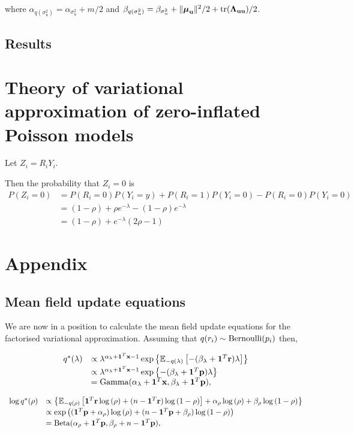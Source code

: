 \documentclass{article}[12pt]
\begin{document}
where $\alpha_{q(\sigma^2_u)} = \alpha_{\sigma^2_u} + m/2$ and
$\beta_{q(\sigma^2_u)} = \beta_{\sigma^2_u} + \|{\boldsymbol \mu}_{\bf u}\|^2/2 +  \text{tr}{({\boldsymbol\Lambda}_{{\bf u}{\bf u}})}/2$.

\subsection{Results}

\section{Theory of variational approximation of zero-inflated Poisson models}
Let $Z_i = R_i Y_i$.

Then the probability that $Z_i = 0$ is
$$
\begin{array}{rl}
P(Z_i = 0) &= P(R_i = 0)P(Y_i = y) + P(R_i = 1) P(Y_i = 0) - P(R_i = 0) P(Y_i = 0) \\
&= (1 - \rho) + \rho e^{-\lambda} - (1 - \rho) e^{-\lambda} \\
&= (1 - \rho) + e^{-\lambda}(2 \rho - 1)
\end{array}
$$

\section{Appendix} 

\subsection{Mean field update equations}
We are now in a position to calculate the mean field update equations for the factorised
variational approximation.
Assuming that $q(r_i) \sim \text{Bernoulli} (p_i)$ then,

$$
\begin{array}{rl}
q^*(\lambda)
    & \propto 
    \lambda^{\alpha_\lambda+{\bf 1}^T{\bf x} - 1} 
    \exp\left\{ 
    {\mathbb E}_{-q(\lambda)} \left[
    -(\beta_\lambda + {\bf 1}^T{\bf r}) \lambda 
    \right] 
    \right\} 
    \\ [0.5ex]
    &
    \propto \lambda^{\alpha_\lambda+{\bf 1}^T{\bf x} - 1} \exp{\left \{-(\beta_\lambda + {\bf1}^T{\bf p})\lambda \right \} } 
\\
    & = \text{Gamma} (\alpha_\lambda+{\bf 1}^T{\bf x}, \beta_\lambda+{\bf 1}^T{\bf p}),
\end{array}
$$

$$
\begin{array}{rl}
\log{q^*(\rho)} 
    &
    \propto \left\{ 
    {\mathbb E}_{-q(\rho)}\left[ 
    {\bf 1}^T{\bf r} \log{(\rho)} 
    + (n - {\bf 1}^T{\bf r}) \log{(1 - \rho)} 
    \right] 
    + \alpha_\rho \log{(\rho)} 
    + \beta_\rho \log{(1 - \rho)} 
    \right\} 
    \\ [0.5ex]
    &
    \propto \exp \left( 
    ({\bf 1}^T{\bf p} + \alpha_\rho) \log{(\rho)} 
    + (n - {\bf 1}^T{\bf p} + \beta_\rho) \log{(1 - \rho)} 
    \right) 
    \\ [0.5ex]
    &= \text{Beta} (\alpha_\rho + {\bf 1}^T{\bf p}, \beta_\rho + n - {\bf 1}^T{\bf p}),
\end{array}
$$
\end{document}
